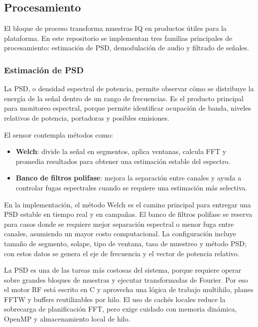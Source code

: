 \subsection{Procesamiento}

El bloque de proceso transforma muestras IQ en productos útiles para la plataforma.
En este repositorio se implementan tres familias principales de procesamiento:
estimación de PSD, demodulación de audio y filtrado de señales.

\subsubsection{Estimación de PSD}

La PSD, o densidad espectral de potencia, permite observar cómo se distribuye la
energía de la señal dentro de un rango de frecuencias. Es el producto principal
para monitoreo espectral, porque permite identificar ocupación de banda, niveles
relativos de potencia, portadoras y posibles emisiones.

El sensor contempla métodos como:

\begin{itemize}
  \item \textbf{Welch}: divide la señal en segmentos, aplica ventanas, calcula FFT
  y promedia resultados para obtener una estimación estable del espectro.

  \item \textbf{Banco de filtros polifase}: mejora la separación entre canales y
  ayuda a controlar fugas espectrales cuando se requiere una estimación más
  selectiva.
\end{itemize}

En la implementación, el método Welch es el camino principal para entregar una PSD
estable en tiempo real y en campañas. El banco de filtros polifase se reserva para
casos donde se requiere mejor separación espectral o menor fuga entre canales,
asumiendo un mayor costo computacional. La configuración incluye tamaño de
segmento, solape, tipo de ventana, tasa de muestreo y método PSD; con estos datos
se genera el eje de frecuencia y el vector de potencia relativo.

La PSD es una de las tareas más costosas del sistema, porque requiere operar sobre
grandes bloques de muestras y ejecutar transformadas de Fourier. Por eso el motor
RF está escrito en C y aprovecha una lógica de trabajo multihilo, planes FFTW y
buffers reutilizables por hilo. El uso de cachés locales reduce la sobrecarga de
planificación FFT, pero exige cuidado con memoria dinámica, OpenMP y almacenamiento
local de hilo.

